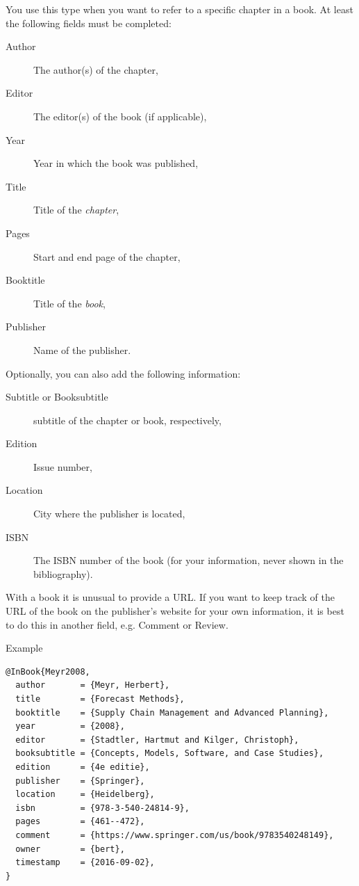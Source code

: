 You use this type when you want to refer to a specific chapter in a book. At least the following fields must be completed:

\begin{description}
  \item[Author] The author(s) of the chapter,
  \item[Editor] The editor(s) of the book (if applicable),
  \item[Year] Year in which the book was published,
  \item[Title] Title of the \emph{chapter},
  \item[Pages] Start and end page of the chapter,
  \item[Booktitle] Title of the \emph{book},
  \item[Publisher] Name of the publisher.
\end{description}

Optionally, you can also add the following information:

\begin{description}
  \item[Subtitle or Booksubtitle] subtitle of the chapter or book, respectively,
  \item[Edition] Issue number,
  \item[Location] City where the publisher is located,
  \item[ISBN] The ISBN number of the book (for your information, never shown in the bibliography).
\end{description}

With a book it is unusual to provide a URL. If you want to keep track of the URL of the book on the publisher's website for your own information, it is best to do this in another field, e.g. Comment or Review.

Example
\begin{verbatim}
@InBook{Meyr2008,
  author       = {Meyr, Herbert},
  title        = {Forecast Methods},
  booktitle    = {Supply Chain Management and Advanced Planning},
  year         = {2008},
  editor       = {Stadtler, Hartmut and Kilger, Christoph},
  booksubtitle = {Concepts, Models, Software, and Case Studies},
  edition      = {4e editie},
  publisher    = {Springer},
  location     = {Heidelberg},
  isbn         = {978-3-540-24814-9},
  pages        = {461--472},
  comment      = {https://www.springer.com/us/book/9783540248149},
  owner        = {bert},
  timestamp    = {2016-09-02},
}
\end{verbatim}



